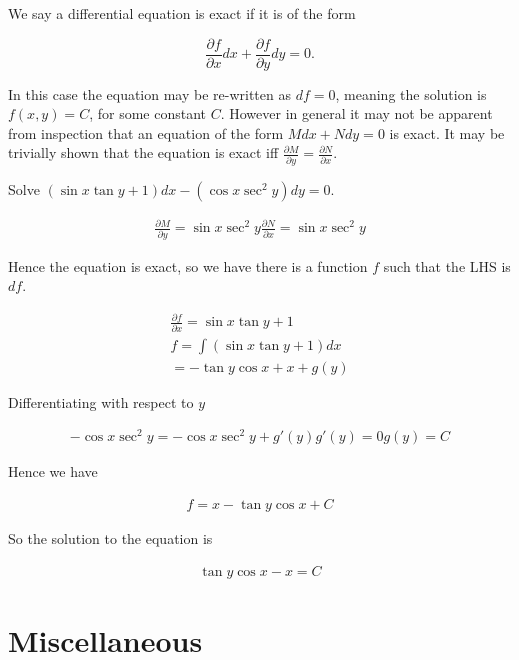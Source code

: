 \documentclass[]{article}
\begin{document}
We say a differential equation is exact if it is of the form 

\[
		\frac{\partial f}{\partial x} dx + \frac{\partial f}{\partial y} dy = 0
.\] 

In this case the equation may be re-written as $df = 0$, meaning the solution is $f(x,y) = C$, for some constant $C$. However in general it may not be apparent from inspection that an equation of the form $M dx + N dy = 0$ is exact. It may be trivially shown that the equation is exact iff $\frac{\partial M}{\partial y} = \frac{\partial N}{\partial x}$.

\begin{eg}
		Solve $(\sin x \tan y + 1) dx - (\cos x \sec^2 y) dy = 0$.

	\begin{align*}
		\frac{\partial M}{\partial y} = \sin x \sec^2 y
		\frac{\partial N}{\partial x} = \sin x \sec^2 y
	\end{align*}

	Hence the equation is exact, so we have there is a function $f$ such that the LHS is $df$.

	\begin{align*}
			\frac{\partial f}{\partial x} = \sin x \tan y + 1 \\
			f = \int (\sin x \tan y + 1) dx \\
			= -\tan y \cos x + x + g(y)
	\end{align*}

	Differentiating with respect to $y$ 

	\begin{align*}
			-\cos x \sec^2 y = -\cos x \sec^2 y + g'(y)
			g'(y) = 0
			g(y) = C
	\end{align*}

	Hence we have

	\begin{align*}
			f = x - \tan y \cos x + C
	\end{align*}

	So the solution to the equation is 

	\begin{align*}
			\tan y \cos x - x = C
	\end{align*}

\end{eg}
 
\section{Miscellaneous}
\end{document}
